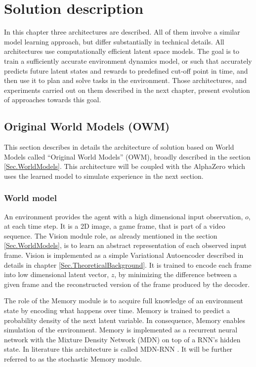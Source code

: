 \section{Solution description} \label{Sec.SolutionDescription}

In this chapter three architectures are described. All of them involve a similar model learning approach, but differ substantially in technical details. All architectures use computationally efficient latent space models. The goal is to train a sufficiently accurate environment dynamics model, or such that accurately predicts future latent states and rewards to predefined cut-off point in time, and then use it to plan and solve tasks in the environment. Those architectures, and experiments carried out on them described in the next chapter, present evolution of approaches towards this goal.

\subsection{Original World Models (OWM)}

This section describes in details the architecture of solution based on World Models \cite{Algo.WorldModels} called ``Original World Models'' (OWM), broadly described in the section \ref{Sec.WorldModels}. This architecture will be coupled with the AlphaZero which uses the learned model to simulate experience in the next section.

\subsubsection{World model}

An environment provides the agent with a high dimensional input observation, $o$, at each time step. It is a 2D image, a game frame, that is part of a video sequence. The Vision module role, as already mentioned in the section \ref{Sec.WorldModels}, is to learn an abstract representation of each observed input frame. Vision is implemented as a simple Variational Autoencoder described in details in chapter \ref{Sec.TheoreticalBackground}. It is trained to encode each frame into low dimensional latent vector, $z$, by minimizing the difference between a given frame and the reconstructed version of the frame produced by the decoder.

The role of the Memory module is to acquire full knowledge of an environment state by encoding what happens over time. Memory is trained to predict a probability density of the next latent variable. In consequence, Memory enables simulation of the environment. Memory is implemented as a recurrent neural network with the Mixture Density Network (MDN) on top of a RNN's hidden state. In literature this architecture is called MDN-RNN \cite{Algo.MDNRNN}. It will be further referred to as the stochastic Memory module.

